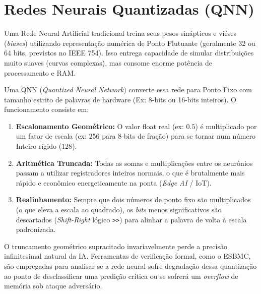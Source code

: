 \section{Redes Neurais Quantizadas (QNN)}

Uma Rede Neural Artificial tradicional treina seus pesos sinápticos e viéses (\textit{biases}) utilizando representação numérica de Ponto Flutuante (geralmente 32 ou 64 bits, previstos no IEEE 754). Isso entrega capacidade de simular distribuições muito suaves (curvas complexas), mas consome enorme potência de processamento e RAM.

Uma QNN (\textit{Quantized Neural Network}) converte essa rede para Ponto Fixo com tamanho estrito de palavras de hardware (Ex: 8-bits ou 16-bits inteiros). 
O funcionamento consiste em:
\begin{enumerate}
    \item \textbf{Escalonamento Geométrico:} O valor float real (ex: $0.5$) é multiplicado por um fator de escala (ex: $256$ para 8-bits de fração) para se tornar num número Inteiro rígido ($128$).
    \item \textbf{Aritmética Truncada:} Todas as somas e multiplicações entre os neurônios passam a utilizar registradores inteiros normais, o que é brutalmente mais rápido e econômico energeticamente na ponta (\textit{Edge AI} / IoT).
    \item \textbf{Realinhamento:} Sempre que dois números de ponto fixo são multiplicados (o que eleva a escala ao quadrado), os \textit{bits} menos significativos são descartados (\textit{Shift-Right} lógico \texttt{>>}) para alinhar a palavra de volta à escala padronizada.
\end{enumerate}

O truncamento geométrico supracitado invariavelmente perde a precisão infinitesimal natural da IA. Ferramentas de verificação formal, como o ESBMC, são empregadas para analisar se a rede neural sofre degradação dessa quantização ao ponto de desclassificar uma predição crítica ou se sofrerá um \textit{overflow} de memória sob ataque adversário.

